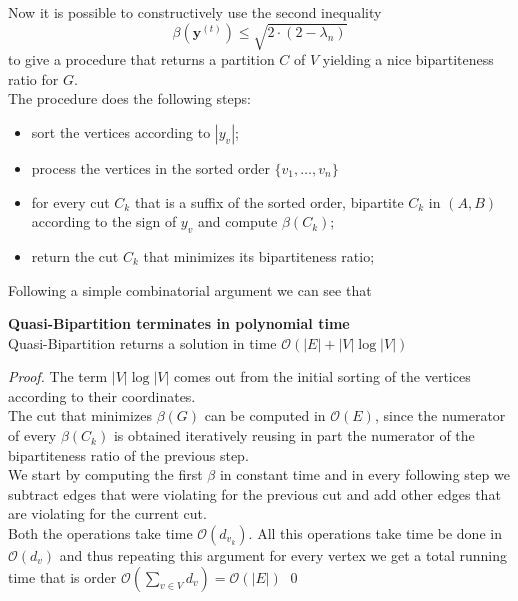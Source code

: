 Now it is possible to constructively use the second inequality
\[ \beta(\mathbf{y}^{(t)}) \leq  \sqrt{2 \cdot (2-\lambda_n)}\]
to give a procedure that returns a partition $ C $ of $ V $ yielding a nice bipartiteness ratio for $ G $.\\
The procedure does the following steps:
\begin{itemize}
\item sort the vertices according to $ |y_v| $;
\item process the vertices in the sorted order $ \{v_1, \dots, v_n \} $
\item for every cut $ C_k $ that is a suffix of the sorted order, bipartite $ C_k $ in $ (A,B) $ according to the sign of $ y_v $ and compute $ \beta(C_k) $;
\item return the cut $ C_k $ that minimizes its bipartiteness ratio;

\end{itemize}


Following a simple combinatorial argument we can see that
\begin{proposition}{\textbf{Quasi-Bipartition terminates in polynomial time}} \\
Quasi-Bipartition returns a solution in time $ \mathcal{O}(|E| + |V| \log |V|) $
\begin{proof}
The term $  |V| \log |V| $ comes out from the initial sorting of the vertices according to their coordinates. \\
The cut that minimizes $ \beta(G) $ can be computed in $ \mathcal{O}(E) $, since the numerator of every $ \beta(C_k) $ is obtained iteratively reusing in part the numerator of the bipartiteness ratio of the previous step. \\
We start by computing the first $ \beta $ in constant time and in every following step we subtract edges that were violating for the previous cut and add other edges that are violating for the current cut. \\
Both the operations take time $ \mathcal{O}(d_{v_k}) $. 
All this operations take time  be done in $ \mathcal{O}(d_v) $ and thus repeating this argument for every vertex we get a total running time that is order $ \mathcal{O}(\sum_{v \in V} d_v) = \mathcal{O}(|E|) $ 
\qed
\end{proof}
\end{proposition}


